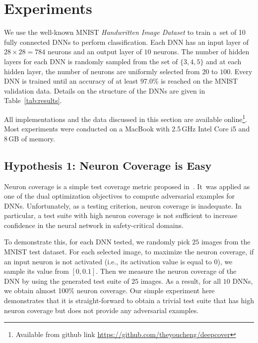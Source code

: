 \documentclass[runningheads,a4paper]{llncs}
\begin{document}
\section{Experiments}%

We use the well-known MNIST \emph{Handwritten Image Dataset} to train a~set
of 10 fully connected DNNs to perform classification.  Each DNN has an input
layer of $28\times 28=784$ neurons and an output layer of $10$ neurons.  The
number of hidden layers for each DNN is randomly sampled from the set of $\{3,
4, 5\}$ and at each hidden layer, the number of neurons are uniformly
selected from $20$ to $100$.  Every DNN is trained until an accuracy of at
least $97.0\%$ is reached on the MNIST validation data.  Details on the
structure of the DNNs are given in Table~\ref{tab:results}.

All implementations and the data discussed in this section are available
online\footnote{Available from github link \url{https://github.com/theyoucheng/deepcover}}.
Most experiments were conducted on a MacBook 
with 2.5\,GHz Intel Core i5 and 8\,GB of memory.

\subsection{Hypothesis 1: Neuron Coverage is Easy}

Neuron coverage is a simple test coverage metric proposed
in~\cite{PCYJ2017}.  It~was applied as one of the dual optimization
objectives to compute adversarial examples for DNNs.  Unfortunately, as a
testing criterion, neuron coverage is inadequate.  In particular, a test
suite with high neuron coverage is not sufficient to increase confidence in
the neural network in safety-critical domains.

To demonstrate this, for each DNN tested, we randomly pick $25$ images from
the MNIST test dataset.  For each selected image, to maximize the neuron
coverage, if an input neuron is not activated (i.e., its activation value
is equal to 0), we sample its value from $[0, 0.1]$.  Then we measure
the neuron coverage of the DNN by using the generated test suite of $25$
images.  As a result, for all $10$ DNNs, we obtain almost 100\% neuron
coverage.  Our simple experiment here demonstrates that it is
straight-forward to obtain a trivial test suite that has high neuron
coverage but does not provide any adversarial examples.
\end{document}
